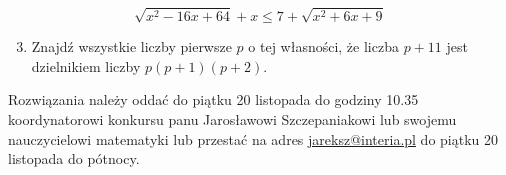 \documentclass[10pt]{article}
\begin{document}
\[
\sqrt{x^{2}-16 x+64}+x \leq 7+\sqrt{x^{2}+6 x+9}
\]

\begin{enumerate}
  \setcounter{enumi}{2}
  \item Znajdź wszystkie liczby pierwsze \(p\) o tej własności, że liczba \(p+11\) jest dzielnikiem liczby \(p(p+1)(p+2)\).
\end{enumerate}

Rozwiązania należy oddać do piątku 20 listopada do godziny 10.35 koordynatorowi konkursu panu Jarosławowi Szczepaniakowi lub swojemu nauczycielowi matematyki lub przestać na adres \href{mailto:jareksz@interia.pl}{jareksz@interia.pl} do piątku 20 listopada do pótnocy.
\end{document}

